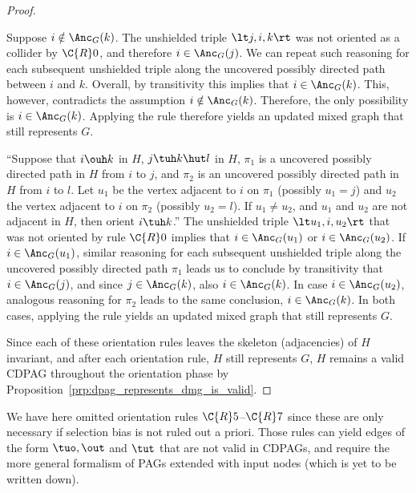 \begin{proof}
\begin{description}
      Suppose $i \notin \Anc_G(k)$.
      The unshielded triple $\lt j, i, k \rt$ was not oriented as a collider by $\C{R}0$, and therefore $i \in \Anc_G(j)$.
      We can repeat such reasoning for each subsequent unshielded triple along the uncovered possibly directed path between $i$ and $k$.
      Overall, by transitivity this implies that $i \in \Anc_G(k)$.
      This, however, contradicts the assumption $i \notin \Anc_G(k)$.
      Therefore, the only possibility is $i \in \Anc_G(k)$.
      Applying the rule therefore yields an updated mixed graph that still represents $G$.
    \item[$\C{R}10$] ``Suppose that $i \ouh k$ in $H$, $j \tuh k \hut l$ in $H$, $\pi_1$ is a uncovered possibly directed path in $H$ from $i$ to $j$, and $\pi_2$ is an uncovered possibly directed path in $H$ from $i$ to $l$. Let $u_1$ be the vertex adjacent to $i$ on $\pi_1$ (possibly $u_1 = j$) and $u_2$ the vertex adjacent to $i$ on $\pi_2$ (possibly $u_2 = l$). If $u_1 \ne u_2$, and $u_1$ and $u_2$ are not adjacent in $H$, then orient $i \tuh k$.''
      The unshielded triple $\lt u_1, i, u_2 \rt$ that was not oriented by rule $\C{R}0$ implies that $i \in \Anc_G(u_1)$ or $i \in \Anc_G(u_2)$.
      If $i \in \Anc_G(u_1)$, similar reasoning for each subsequent unshielded triple along the uncovered possibly directed path $\pi_1$ leads us to conclude by transitivity that $i \in \Anc_G(j)$, and since $j \in \Anc_G(k)$, also $i \in \Anc_G(k)$.
      In case $i \in \Anc_G(u_2)$, analogous reasoning for $\pi_2$ leads to the same conclusion, $i \in \Anc_G(k)$.
      In both cases, applying the rule yields an updated mixed graph that still represents $G$.
  \end{description}
  Since each of these orientation rules leaves the skeleton (adjacencies) of $H$ invariant,
  and after each orientation rule, $H$ still represents $G$,
  $H$ remains a valid CDPAG throughout the orientation phase
  by Proposition~\ref{prp:dpag_represents_dmg_is_valid}. 
\end{proof}
We have here omitted orientation rules $\C{R}5$--$\C{R}7$ since these are only necessary if selection bias is not ruled out a
priori. 
Those rules can yield edges of the form $\tuo, \out$ and $\tut$ that are not valid in CDPAGs, and require the more general
formalism of PAGs extended with input nodes (which is yet to be written down).


